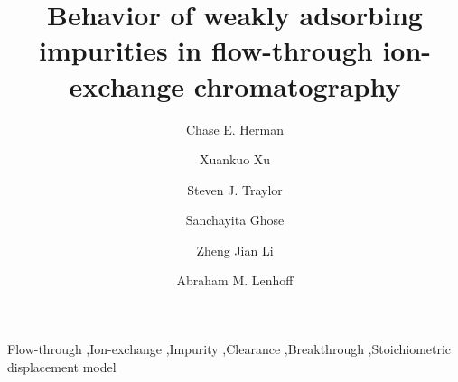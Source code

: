 \documentclass[preprint,review,12pt]{elsarticle}
\begin{document}
\begin{frontmatter}
    \title{Behavior of weakly adsorbing impurities in flow-through ion-exchange chromatography}
    \author[inst1]{Chase E. Herman}
    \author[inst2]{Xuankuo Xu}
    \author[inst2]{Steven J. Traylor}
    \author[inst2]{Sanchayita Ghose}
    \author[inst2]{Zheng Jian Li}
    \author[inst1]{Abraham M. Lenhoff }






    \begin{keyword}
    Flow-through \sep Ion-exchange \sep Impurity \sep Clearance \sep Breakthrough \sep Stoichiometric displacement model
    \end{keyword}


    \begin{abstract}


\end{abstract}
\end{frontmatter}
\end{document}
